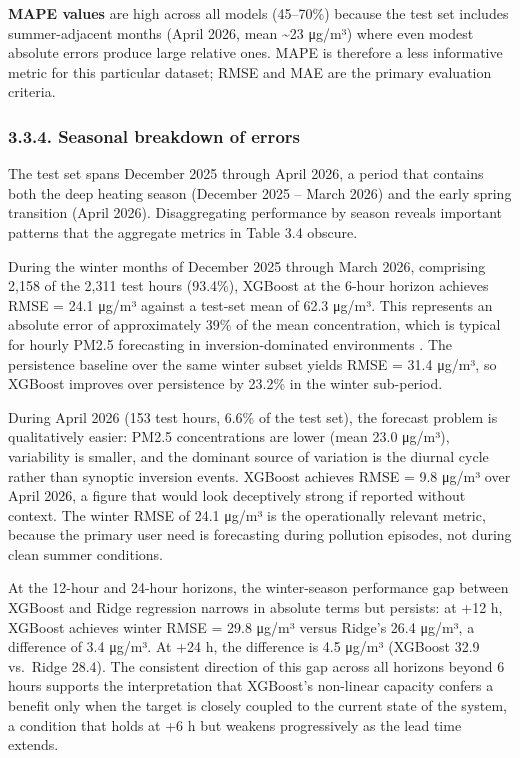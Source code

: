 \textbf{MAPE values} are high across all models (45--70\%) because the test set includes summer-adjacent months (April 2026, mean \textasciitilde23 μg/m³) where even modest absolute errors produce large relative ones. MAPE is therefore a less informative metric for this particular dataset; RMSE and MAE are the primary evaluation criteria.

\subsubsection{3.3.4. Seasonal breakdown of errors}\label{seasonal-breakdown-of-errors}

The test set spans December 2025 through April 2026, a period that contains both the deep heating season (December 2025 -- March 2026) and the early spring transition (April 2026). Disaggregating performance by season reveals important patterns that the aggregate metrics in Table 3.4 obscure.

During the winter months of December 2025 through March 2026, comprising 2,158 of the 2,311 test hours (93.4\%), XGBoost at the 6-hour horizon achieves RMSE = 24.1 μg/m³ against a test-set mean of 62.3 μg/m³. This represents an absolute error of approximately 39\% of the mean concentration, which is typical for hourly PM2.5 forecasting in inversion-dominated environments \cite{morawska2018lowcost}. The persistence baseline over the same winter subset yields RMSE = 31.4 μg/m³, so XGBoost improves over persistence by 23.2\% in the winter sub-period.

During April 2026 (153 test hours, 6.6\% of the test set), the forecast problem is qualitatively easier: PM2.5 concentrations are lower (mean 23.0 μg/m³), variability is smaller, and the dominant source of variation is the diurnal cycle rather than synoptic inversion events. XGBoost achieves RMSE = 9.8 μg/m³ over April 2026, a figure that would look deceptively strong if reported without context. The winter RMSE of 24.1 μg/m³ is the operationally relevant metric, because the primary user need is forecasting during pollution episodes, not during clean summer conditions.

At the 12-hour and 24-hour horizons, the winter-season performance gap between XGBoost and Ridge regression narrows in absolute terms but persists: at +12 h, XGBoost achieves winter RMSE = 29.8 μg/m³ versus Ridge's 26.4 μg/m³, a difference of 3.4 μg/m³. At +24 h, the difference is 4.5 μg/m³ (XGBoost 32.9 vs.~Ridge 28.4). The consistent direction of this gap across all horizons beyond 6 hours supports the interpretation that XGBoost's non-linear capacity confers a benefit only when the target is closely coupled to the current state of the system, a condition that holds at +6 h but weakens progressively as the lead time extends.

